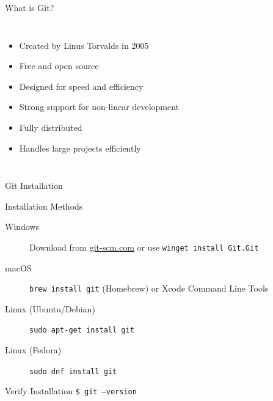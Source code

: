 \documentclass[aspectratio=169]{beamer}
\begin{document}
	\begin{frame}{What is Git?}
		\begin{columns}
			\begin{itemize}
				\item Created by Linus Torvalds in 2005
				\item Free and open source
				\item Designed for speed and efficiency
				\item Strong support for non-linear development
				\item Fully distributed
				\item Handles large projects efficiently
			\end{itemize}
			
			\begin{center}
			\end{center}
		\end{columns}
	\end{frame}
	
	\begin{frame}{Git Installation}
		\begin{alertblock}{Installation Methods}
			\begin{description}
				\item[Windows] Download from \href{https://git-scm.com}{git-scm.com} or use \texttt{winget install Git.Git}
				\item[macOS] \texttt{brew install git} (Homebrew) or Xcode Command Line Tools
				\item[Linux (Ubuntu/Debian)] \texttt{sudo apt-get install git}
				\item[Linux (Fedora)] \texttt{sudo dnf install git}
			\end{description}
		\end{alertblock}
		
		\vspace{0.3cm}
		\begin{exampleblock}{Verify Installation}
			\texttt{\$ git --version}
		\end{exampleblock}
	\end{frame}
	
\end{document}
